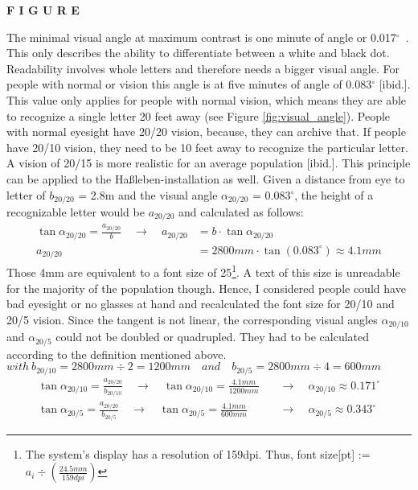 \textbf{F I G U R E}

The minimal visual angle at maximum contrast is one minute of angle or 0.017$^\circ$~\cite{SehwinkelLesbarkeit}. This only describes the ability to differentiate between a white and black dot. Readability involves whole letters and therefore needs a bigger visual angle. For people with normal or vision this angle is at five minutes of angle of 0.083$^\circ$ [ibid.]. This value only applies for people with normal vision, which means they are able to recognize a single letter 20 feet away (see Figure \ref{fig:visual_angle}). People with normal eyesight have 20/20 vision, because, they can archive that. If people have 20/10 vision, they need to be 10 feet away to recognize the particular letter. A vision of 20/15 is more realistic for an average population [ibid.]. This principle can be applied to the Haßleben-installation as well. Given a distance from eye to letter of $b_{20/20}$ = 2.8m and the visual angle $\alpha_{20/20}$ = 0.083$^\circ$, the height of a recognizable letter would be $a_{20/20}$ and calculated as follows:
\begin{align*}
	\tan{\alpha_{20/20}} = \frac{a_{20/20}}{b} \quad \to \quad a_{20/20} &= b \cdot \tan{\alpha_{20/20}}
	\\
	a_{20/20} &= 2800mm \cdot \tan{(0.083^\circ)} \approx 4.1mm
\end{align*}
Those 4mm are equivalent to a font size of 25\footnote{The system's display has a resolution of 159dpi. Thus, font size[pt] := $a_{i} \div{(\frac{24.5mm}{159dpi})}$}. A text of this size is unreadable for the majority of the population though. Hence, I considered people could have bad eyesight or no glasses at hand and recalculated the font size for 20/10 and 20/5 vision. Since the tangent is not linear, the corresponding visual angles $\alpha_{20/10}$ and $\alpha_{20/5}$ could not be doubled or quadrupled. They had to be calculated according to the definition mentioned above.
\\
$with \ b_{20/10} = 2800mm \div 2 = 1200mm \quad and \quad b_{20/5} = 2800mm \div 4 = 600mm$
\begin{align*}
	\tan{\alpha_{20/10}} = \frac{a_{20/20}}{b_{20/10}} \quad \to \quad \tan{\alpha_{20/10}} = \frac{4.1mm}{1200mm} \quad &\to \quad \alpha_{20/10} \approx 0.171^\circ
\\
	\tan{\alpha_{20/5}} = \frac{a_{20/20}}{b_{20/5}} \quad \to \quad \tan{\alpha_{20/5}} = \frac{4.1mm}{600mm} \quad &\to \quad \alpha_{20/5} \approx 0.343^\circ
\end{align*}

